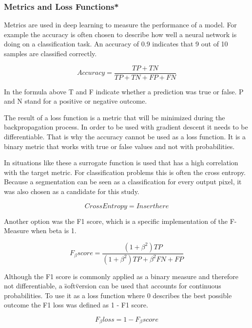 \subsubsection{Metrics and Loss Functions*}

Metrics are used in deep learning to measure the performance of a model. For example the accuracy is often chosen to describe how well a neural network is doing on a classification task. An accuracy of 0.9 indicates that 9 out of 10 samples are classified correctly.

\begin{equation}
Accuracy = \frac{TP+TN}{TP+TN+FP+FN}
\end{equation}

In the formula above T and F indicate whether a prediction was true or false. P and N stand for a positive or negative outcome.

The result of a loss function is a metric that will be minimized during the backpropagation process. In order to be used with gradient descent it needs to be differentiable. That is why the accuracy cannot be used as a loss function. It is a binary metric that works with true or false values and not with probabilities.

In situations like these a surrogate function is used that has a high correlation with the target metric. For classification problems this is often the cross entropy. Because a segmentation can be seen as a classification for every output pixel, it was also chosen as a candidate for this study.

\begin{equation}
Cross Entropy = Insert here
\end{equation}

Another option was the F1 score, which is a specific implementation of the F-Measure when beta is 1. 

\begin{equation}
F_\beta score= \frac{(1 + \beta^2) TP}{(1+\beta^2)TP+\beta^2FN+FP}
\end{equation}

Although the F1 score is commonly applied as a binary measure and therefore not differentiable, a \"soft\" version can be used that accounts for continuous probabilities. To use it as a loss function where 0 describes the best possible outcome the F1 loss was defined as 1 - F1 score.

\begin{equation}
F_\beta loss = 1 - F_\beta score
\end{equation}

